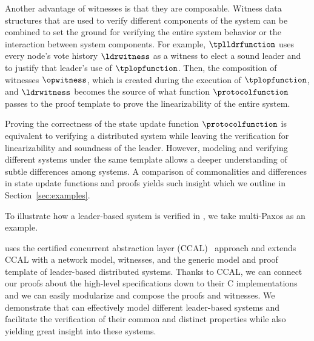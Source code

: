 Another advantage of witnesses is that they are composable. Witness data
structures that are used to verify different components of the system can be
combined to set the ground for verifying the entire system behavior or the
interaction between system components. For example, $\tplldrfunction$ uses every
node's vote history $\ldrwitness$ as a witness to elect a sound leader and to
justify that leader's use of $\tplopfunction$. Then, the composition of witnesses
$\opwitness$, which is created during the execution of $\tplopfunction$, and
$\ldrwitness$ becomes the source of what function $\protocolfunction$ passes to
the proof template to prove the linearizability of the entire system.


Proving the correctness of the state update function $\protocolfunction$ is equivalent to
verifying a distributed system while leaving the verification for linearizability
and soundness of the leader. However, modeling and verifying different systems
under the same template allows a deeper understanding of subtle differences among systems.
A comparison of commonalities and differences in state update functions
and proofs yields such insight which we outline in Section~\ref{sec:examples}.

%


To illustrate how a leader-based system is verified in \sysname{},
we take multi-Paxos as an example.

\sysname{} uses the certified concurrent abstraction layer (CCAL)~\cite{concurrency}
approach and extends CCAL with a network model, witnesses, and the generic model
and proof template of leader-based distributed systems. Thanks to CCAL, we
can connect our proofs about the high-level specifications down to their C implementations
and we can easily modularize and compose the proofs and witnesses.
We demonstrate that \sysname{} can effectively model different
leader-based systems and facilitate the verification of their common and
distinct properties while also yielding great insight into these systems.

